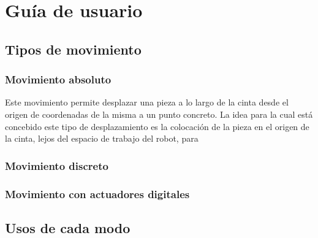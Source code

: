 \chapter*{Guía de usuario}
\pagestyle{especial}
{}

\section{Tipos de movimiento}

\subsection{Movimiento absoluto}

Este movimiento permite desplazar una pieza a lo largo de la cinta desde el origen
de coordenadas de la misma a un punto concreto. La idea para la cual está concebido
este tipo de desplazamiento es la colocación de la pieza en el origen de la cinta,
lejos del espacio de trabajo del robot, para 

\subsection{Movimiento discreto}

\subsection{Movimiento con actuadores digitales}

\section{Usos de cada modo}